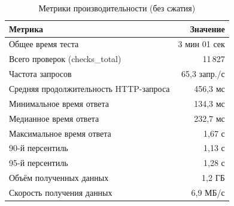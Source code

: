 \documentclass[12pt]{article}
\begin{document}
\begin{table}[h]
    \centering
    \caption{Метрики производительности (без сжатия)}
    \begin{tabular}{lr}
        \toprule
        \textbf{Метрика}                       & \textbf{Значение} \\
        \midrule
        Общее время теста                      & 3 мин 01 сек      \\
        \hline
        Всего проверок (checks\_total)         & 11\,827           \\
        Частота запросов                       & 65,3 запр./с      \\
        \hline
        Средняя продолжительность HTTP-запроса & 456,3 мс          \\
        Минимальное время ответа               & 134,3 мс          \\
        Медианное время ответа                 & 232,7 мс          \\
        Максимальное время ответа              & 1,67 с            \\
        90-й персентиль                        & 1,13 с            \\
        95-й персентиль                        & 1,28 с            \\
        \hline
        Объём полученных данных                & 1,2 ГБ            \\
        Скорость получения данных              & 6,9 МБ/с          \\
        \bottomrule
    \end{tabular}
\end{table}
\end{document}
